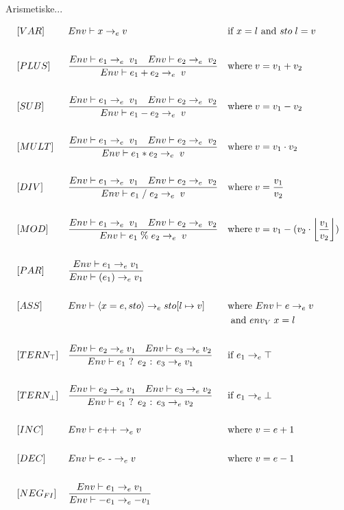 Arismetiske...

\begin{align*}
&[VAR] & &Env \vdash x \rightarrow_e v & &\text{if } x = l \text{ and } sto\; l = v\\\\
&[PLUS] & &\frac{Env \vdash e_1 \rightarrow_e\; v_1\quad Env \vdash e_2 \rightarrow_e\; v_2}{Env \vdash e_1 + e_2 \rightarrow_e\; v} & &\text{where}\; v = v_1 + v_2\\\\
&[SUB] & &\frac{Env \vdash e_1 \rightarrow_e\; v_1\quad Env \vdash e_2 \rightarrow_e\; v_2}{Env \vdash e_1 - e_2 \rightarrow_e\; v} & &\text{where}\; v = v_1 - v_2\\\\
&[MULT] & &\frac{Env \vdash e_1 \rightarrow_e\; v_1\quad Env \vdash e_2 \rightarrow_e\; v_2}{Env \vdash e_1 * e_2 \rightarrow_e\; v} & &\text{where}\; v = v_1 \cdot v_2\\\\
&[DIV] & &\frac{Env \vdash e_1 \rightarrow_e\; v_1\quad Env \vdash e_2 \rightarrow_e\; v_2}{Env \vdash e_1\; /\; e_2 \rightarrow_e\; v} & &\text{where}\; v = \frac{v_1}{v_2}\\\\
&[MOD] & &\frac{Env \vdash e_1 \rightarrow_e\; v_1\quad Env \vdash e_2 \rightarrow_e\; v_2}{Env \vdash e_1\; \%\; e_2 \rightarrow_e\; v} & &\text{where}\; v = v_1 - (v_2 \cdot \floor*{\frac{v_1}{v_2}})\\\\
&[PAR] & &\frac{Env \vdash e_1 \rightarrow_e v_1}{Env \vdash (e_1) \rightarrow_e v_1}\\\\
&[ASS] & &Env \vdash \langle x = e, sto \rangle \rightarrow_e sto[l \mapsto v] & &\text{where } Env \vdash e \rightarrow_e v\\
& & & & &\text{ and } env_V\; x = l\\\\
&[TERN_\top] & &\frac{Env \vdash e_2 \rightarrow_e v_1\quad Env \vdash e_3 \rightarrow_e v_2}{Env \vdash e_1 \text{ ? } e_2 \text{ : } e_3 \rightarrow_e v_1} & &\text{if } e_1 \rightarrow_e \top\\\\
&[TERN_\bot] & &\frac{Env \vdash e_2 \rightarrow_e v_1\quad Env \vdash e_3 \rightarrow_e v_2}{Env \vdash e_1 \text{ ? } e_2 \text{ : } e_3 \rightarrow_e v_2} & &\text{if } e_1 \rightarrow_e \bot\\\\
&[INC] & &Env \vdash e \text{++} \rightarrow_e v& &\text{where } v = e + 1\\\\
&[DEC] & &Env \vdash e \text{- -} \rightarrow_e v& &\text{where } v = e - 1\\\\
&[NEG_{FI}] & &\frac{Env \vdash e_1 \rightarrow_e v_1}{Env \vdash -e_1 \rightarrow_e -v_1}  & &\\\\
\end{align*}

